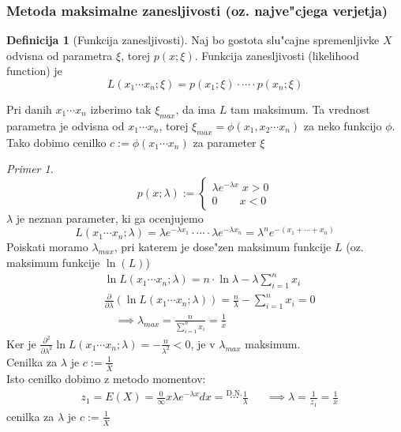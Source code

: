 \documentclass[a4paper,12pt]{article}
\theoremstyle{definition}
\newtheorem{defn}[counter]{Definicija}
\theoremstyle{remark}
\newtheorem*{ex}{Primer}
\begin{document}

\subsubsection{Metoda maksimalne zanesljivosti (oz. najve"cjega verjetja)}

\begin{defn}[Funkcija zanesljivosti]
    Naj bo gostota slu"cajne spremenljivke $X$ odvisna od parametra $\xi$, torej $p(x; \xi)$. Funkcija
    zanesljivosti (likelihood function) je
    \begin{equation*}
        L(x_1 \cdots x_n; \xi) = p(x_1; \xi) \cdot \cdots \cdot p(x_n; \xi)
    \end{equation*}
\end{defn}

Pri danih $x_1 \cdots x_n$ izberimo tak $\xi_{max}$, da ima $L$ tam maksimum. Ta vrednost parametra je odvisna od
$x_1 \cdots x_n$, torej $\xi_{max} = \phi(x_1, x_2 \cdots x_n)$ za neko funkcijo $\phi$. Tako dobimo cenilko
$c := \phi(x_1 \cdots x_n)$ za parameter $\xi$

\begin{ex}
    \begin{equation*}
        p(x; \lambda) := \begin{cases}
            \lambda e^{-\lambda x} \; x > 0 \\
            0 \qquad x < 0
        \end{cases}
    \end{equation*}
    $\lambda$ je neznan parameter, ki ga ocenjujemo
    \begin{equation*}
        L(x_1 \cdots x_n; \lambda) = \lambda e^{-\lambda x_1} \cdot \cdots \cdot \lambda e^{-\lambda x_n} =
        \lambda^n e^{-(x_1 + \cdots + x_n)}
    \end{equation*}
    Poiskati moramo $\lambda_{max}$, pri katerem je dose"zen maksimum funkcije $L$ (oz. maksimum funkcije $\ln(L)$)
    \begin{align*}
        &\ln L(x_1 \cdots x_n; \lambda) = n \cdot \ln \lambda - \lambda \sum_{i=1}^{n} x_i \\
        &\frac{\partial}{\partial \lambda} (\ln L(x_1 \cdots x_n; \lambda)) = \frac{n}{\lambda} -
            \sum_{i=1}^{n} x_i = 0 \\
        &\quad \implies \lambda_{max} = \frac{n}{\sum_{i=1}^n x_i} = \frac{1}{\overline{x}}
    \end{align*}
    Ker je $\frac{\partial^2}{\partial \lambda^2} \ln L(x_1 \cdots x_n; \lambda) = -\frac{n}{\lambda^2} < 0$,
    je v $\lambda_{max}$ maksimum. \\
    Cenilka za $\lambda$ je $c := \frac{1}{\overline{X}}$ \\
    Isto cenilko dobimo z metodo momentov:
    \begin{align*}
        &z_1 = E(X) = \frac{0}{\infty} x \lambda e^{-\lambda x} dx = \stackrel{\text{D.N.}}{\cdots} \frac{1}{\lambda} &
        &\implies \lambda = \frac{1}{z_1} = \frac{1}{\overline{x}}
    \end{align*}
    cenilka za $\lambda$ je $c := \frac{1}{\overline{X}}$
\end{ex}
\end{document}
